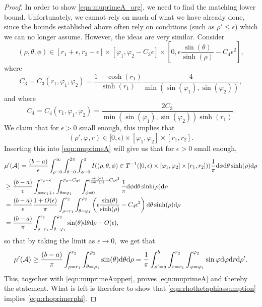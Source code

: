 \documentclass[a4paper,12pt]{article}
\newcommand{\CA}{{\mathcal{A}}}
\newcommand{\dd}{{\rm d}}
\begin{document}
\begin{proof}
In order to show \eqref{eqn:muprimeA_org}, we need to find the matching lower bound. 
Unfortunately, we cannot rely on much of what we have already done, since the bounds 
established above often rely on conditions (such as $\rho'\leq \epsilon$) which we can no 
longer assume. However, the ideas are very similar. Consider
\begin{equation} \label{eqn:rhothetaphiassumption}
 (\rho,\theta,\phi)
\in [r_1+\epsilon,r_2-\epsilon] \times [\varphi_1,\varphi_2-C_3\epsilon] 
\times \left[0,\epsilon\frac{\sin(\theta)}{\sinh(\rho)} -C_4 \epsilon^2\right],
\end{equation}
where
\[
C_3=C_3(r_1,\varphi_1,\varphi_2)
=\frac{1+\cosh(r_1)}{\sinh(r_1)}\frac{4}{\min(\sin(\varphi_1),\sin(\varphi_2))},
\]
and where 
\[
C_4=C_4(r_1,\varphi_1,\varphi_2)
=\frac{2C_3}{\min(\sin(\varphi_1),\sin(\varphi_2))\sinh(r_1)}.
\]
We claim that for $\epsilon>0$ small enough, this implies that 
\begin{equation} \label{eqn:rhoprimerphi}
(\rho',\varphi,r)
\in [0,\epsilon)\times [\varphi_1,\varphi_2] \times [r_1,r_2] .
\end{equation}
Inserting this into \eqref{eqn:muprimeA} will give us that for $\epsilon>0$ small enough,
\begin{align*}
& \mu'(\CA)=\frac{(b-a)}{\epsilon}
\int_{\rho=0}^\infty  \int_{\theta=0}^{2 \pi} \int_{\phi=0}^{\pi} 
I((\rho,\theta,\phi)\in T^{-1}([0,\epsilon) \times [\varphi_1,\varphi_2] \times [r_1,r_2])) 
\frac{1}{\pi}\dd \phi \dd \theta \sinh(\rho) \dd \rho \nonumber \\
& \geq \frac{(b-a)}{\epsilon}
\int_{\rho=r_1+\epsilon}^{r_2-\epsilon}
\int_{\theta=\varphi_1}^{\varphi_2-C_3\epsilon}  
\int_{\phi=0}^{\epsilon\frac{\sin(\theta)}{\sinh(\rho)}-C_4 \epsilon^2}
\frac{1}{\pi}\dd \phi \dd \theta \sinh(\rho) \dd \rho \nonumber \\
& =\frac{(b-a)}{\epsilon}\frac{1+O(\epsilon)}{\pi}
\int_{\rho=r_1}^{r_2}  \int_{\theta=\varphi_1}^{\varphi_2}  
\left(\epsilon\frac{\sin(\theta)}{\sinh(\rho)} -C_4 \epsilon^2\right)
\dd \theta \sinh(\rho) \dd \rho \nonumber \\
& =\frac{(b-a)}{\pi}\int_{\rho=r_1}^{r_2}  \int_{\theta=\varphi_1}^{\varphi_2}  \sin(\theta) \dd \theta \dd \rho 
-O(\epsilon), \nonumber
\end{align*}
so that by taking the limit as $\epsilon\to 0,$ 
we get that 
\[
\mu'(\CA)\geq \frac{(b-a)}{\pi}\int_{\rho=r_1}^{r_2}  
\int_{\theta=\varphi_1}^{\varphi_2} 
\sin(\theta) \dd \theta \dd \rho 
=\frac{1}{\pi}\int_{\rho'=a}^b \int_{r=r_1}^{r_2} 
\int_{\varphi=\varphi_1}^{\varphi_2} 
\sin \varphi \dd \varphi \dd r \dd \rho'.  
\]
This, together with \eqref{eqn:muprimeAupper}, proves \eqref{eqn:muprimeA} and thereby the statement. 
What is left is therefore to show that
\eqref{eqn:rhothetaphiassumption} implies \eqref{eqn:rhoprimerphi}. 



\end{proof}
\end{document}

